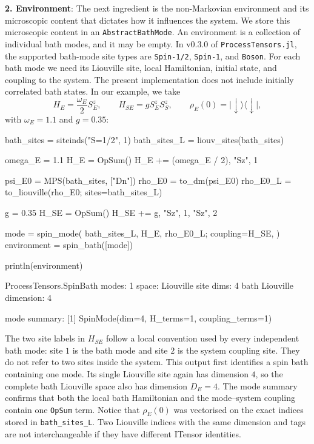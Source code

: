 \textbf{2.
Environment}: The next ingredient is the non-Markovian environment and its microscopic content that dictates how it influences the system.
We store this microscopic content in an \texttt{AbstractBathMode}.
An environment is a collection of individual bath modes, and it may be empty.
In v0.3.0 of \texttt{ProcessTensors.jl}, the supported bath-mode site types are \texttt{Spin-1/2}, \texttt{Spin-1}, and \texttt{Boson}.
For each bath mode we need its Liouville site, local Hamiltonian, initial state, and coupling to the system.
The present implementation does not include initially correlated bath states.
In our example, we take
%
\begin{equation}
    H_E=\frac{\omega_E}{2}S_E^z, \qquad
    H_{SE}=gS_E^zS_S^z, \qquad \rho_E(0)=\lvert\!\downarrow\rangle \langle\downarrow\!\rvert,
    \label{eq:dense-example-bath-model}
\end{equation}
%
with \(\omega_E=1.1\) and \(g=0.35\):
%
\begin{julialistingpair}[
    caption={Bath Hamiltonian, initial state, coupling, and \texttt{SpinBath} constructor.}, label={lst:pt-ingredients-bath},
    ]
%
    \begin{juliacode}[paired]
bath_sites = siteinds("S=1/2", 1)
bath_sites_L = liouv_sites(bath_sites)

omega_E = 1.1
H_E = OpSum()
H_E += (omega_E / 2), "Sz", 1

psi_E0 = MPS(bath_sites, ["Dn"])
rho_E0 = to_dm(psi_E0)
rho_E0_L = to_liouville(rho_E0; sites=bath_sites_L)

g = 0.35
H_SE = OpSum()
H_SE += g, "Sz", 1, "Sz", 2

mode = spin_mode(
    bath_sites_L,
    H_E,
    rho_E0_L;
    coupling=H_SE,
)
environment = spin_bath([mode])

println(environment)
    \end{juliacode}
%
    \begin{juliaoutput}[paired]
ProcessTensors.SpinBath
  modes: 1
  space: Liouville
  site dims: 4
  bath Liouville dimension: 4

  mode summary:
    [1] SpinMode(dim=4, H_terms=1, coupling_terms=1)
    \end{juliaoutput}
%
\end{julialistingpair}
%
The two site labels in \(H_{SE}\) follow a local convention used by every independent bath mode: site \(1\) is the bath mode and site \(2\) is the system coupling site.
They do not refer to two sites inside the system.
This output first identifies a spin bath containing one mode.
Its single Liouville site again has dimension \(4\), so the complete bath Liouville space also has dimension \(D_E=4\).
The mode summary confirms that both the local bath Hamiltonian and the mode--system coupling contain one \texttt{OpSum} term.
Notice that \(\rho_E(0)\) was vectorised on the exact indices stored in \texttt{bath\_sites\_L}.
Two Liouville indices with the same dimension and tags are not interchangeable if they have different ITensor identities.

